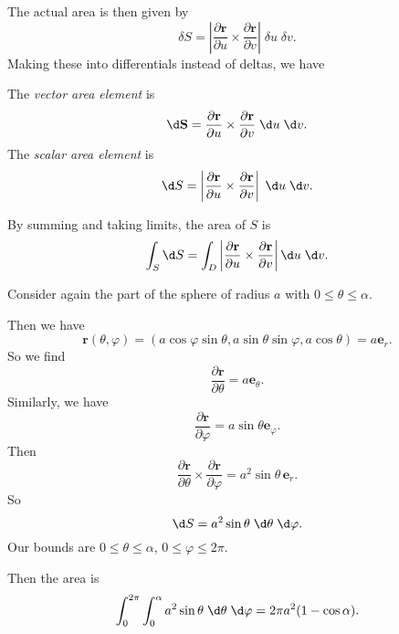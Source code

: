 \documentclass[a4paper]{article}
\begin{document}
The actual area is then given by
\[
  \delta S =\left|\frac{\partial \mathbf{r}}{\partial u}\times \frac{\partial \mathbf{r}}{\partial v}\right|\;\delta u\;\delta v.
\]
Making these into differentials instead of deltas, we have
\begin{prop}
  The \emph{vector area element} is
  \[
    \d \mathbf{S} = \frac{\partial \mathbf{r}}{\partial u}\times \frac{\partial \mathbf{r}}{\partial v}\;\d u\;\d v.
  \]
  The \emph{scalar area element} is
  \[
    \d S = \left|\frac{\partial \mathbf{r}}{\partial u}\times \frac{\partial \mathbf{r}}{\partial v}\right|\;\d u\;\d v.
  \]
\end{prop}
By summing and taking limits, the area of $S$ is
\[
  \int_S \d S = \int_D \left|\frac{\partial \mathbf{r}}{\partial u}\times \frac{\partial \mathbf{r}}{\partial v}\right| \d u\;\d v.
\]
\begin{eg}
  Consider again the part of the sphere of radius $a$ with $0 \leq \theta \leq \alpha$.
  \begin{center}
  \end{center}
  Then we have
  \[
    \mathbf{r}(\theta, \varphi) = (a\cos\varphi\sin \theta, a\sin \theta\sin \varphi, a\cos \theta) = a\mathbf{e}_r.
  \]
  So we find
  \[
    \frac{\partial \mathbf{r}}{\partial \theta} = a\mathbf{e}_\theta.
  \]
  Similarly, we have
  \[
    \frac{\partial \mathbf{r}}{\partial \varphi} = a\sin \theta \mathbf{e}_\varphi.
  \]
  Then
  \[
    \frac{\partial \mathbf{r}}{\partial \theta}\times \frac{\partial \mathbf{r}}{\partial \varphi} = a^2\sin \theta\, \mathbf{e}_r.
  \]
  So
  \[
    \d S = a^2\sin \theta\;\d \theta\;\d \varphi.
  \]
  Our bounds are $0 \leq \theta \leq \alpha$, $0 \leq \varphi \leq 2\pi$.

  Then the area is
  \[
    \int_0^{2\pi}\int_0^{\alpha} a^2\sin \theta\;\d \theta \;\d \varphi = 2\pi a^2(1 - \cos\alpha).
  \]
\end{eg}
\end{document}
